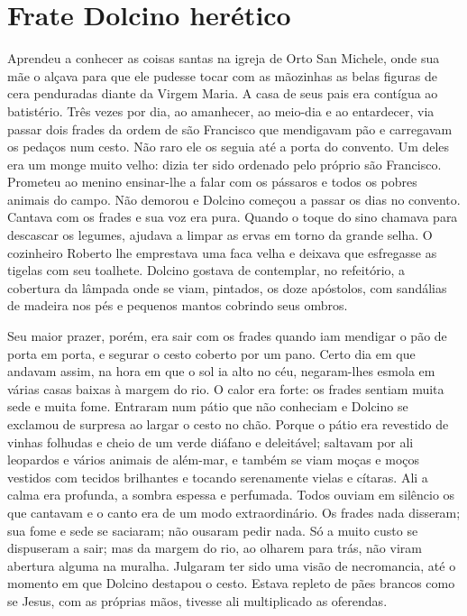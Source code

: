 \chapter{Frate Dolcino herético}

Aprendeu a conhecer as coisas santas na igreja de Orto San Michele, onde
sua mãe o alçava para que ele pudesse tocar com as mãozinhas as belas
figuras de cera penduradas diante da Virgem Maria. A casa de seus pais era
contígua ao batistério. Três vezes por dia, ao amanhecer, ao meio-dia e ao
entardecer, via passar dois frades da ordem de são Francisco que
mendigavam pão e carregavam os pedaços num cesto. Não raro ele os seguia
até a porta do convento. Um deles era um monge muito velho: dizia ter sido
ordenado pelo próprio são Francisco. Prometeu ao menino ensinar-lhe a
falar com os pássaros e todos os pobres animais do campo. Não demorou e
Dolcino começou a passar os dias no convento. Cantava com os frades e sua
voz era pura. Quando o toque do sino chamava para descascar os legumes,
ajudava a limpar as ervas em torno da grande selha. O cozinheiro Roberto
lhe emprestava uma faca velha e deixava que esfregasse as tigelas com seu
toalhete. Dolcino gostava de contemplar, no refeitório, a cobertura da
lâmpada onde se viam, pintados, os doze apóstolos, com sandálias de
madeira nos pés e pequenos mantos cobrindo seus ombros.

Seu maior prazer, porém, era sair com os frades quando iam mendigar o pão
de porta em porta, e segurar o cesto coberto por um pano. Certo dia em que
andavam assim, na hora em que o sol ia alto no céu, negaram-lhes esmola em
várias casas baixas à margem do rio. O calor era forte: os frades sentiam
muita sede e muita fome. Entraram num pátio que não conheciam e Dolcino se
exclamou de surpresa ao largar o cesto no chão. Porque o pátio era
revestido de vinhas folhudas e cheio de um verde diáfano e deleitável;
saltavam por ali leopardos e vários animais de além-mar, e também se viam
moças e moços vestidos com tecidos brilhantes e tocando serenamente vielas
e cítaras. Ali a calma era profunda, a sombra espessa e perfumada. Todos
ouviam em silêncio os que cantavam e o canto era de um modo
extraordinário. Os frades nada disseram; sua fome e sede se saciaram; não
ousaram pedir nada. Só a muito custo se dispuseram a sair; mas da margem
do rio, ao olharem para trás, não viram abertura alguma na muralha.
Julgaram ter sido uma visão de necromancia, até o momento em que Dolcino
destapou o cesto. Estava repleto de pães brancos como se Jesus, com as
próprias mãos, tivesse ali multiplicado as oferendas.

